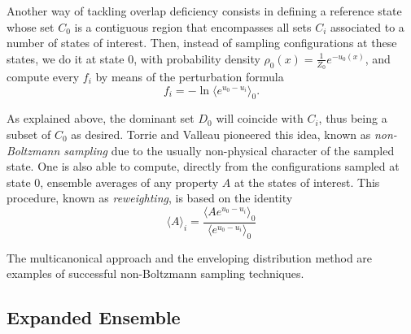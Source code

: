 \documentclass[aip,jcp,reprint,amsmath,amssymb]{revtex4-1}
\begin{document}
Another way of tackling overlap deficiency consists in defining a reference state whose set $C_0$ is a contiguous region that encompasses all sets $C_i$ associated to a number of states of interest. Then, instead of sampling configurations at these states, we do it at state $0$, with probability density $\rho_0(x) = \frac{1}{Z_0} e^{-u_0(x)}$, and compute every $f_i$ by means of the perturbation formula
\begin{equation}
\label{eq:nbs sampling free energy}
f_i = -\ln \langle e^{u_0-u_i} \rangle_0.
\end{equation}

As explained above, the dominant set $D_0$ will coincide with $C_i$, thus being a subset of $C_0$ as desired. Torrie and Valleau\cite{Torrie_1977} pioneered this idea, known as \textit{non-Boltzmann sampling} due to the usually non-physical character of the sampled state. One is also able to compute, directly from the configurations sampled at state $0$, ensemble averages of any property $A$ at the states of interest. This procedure, known as \textit{reweighting}, is based on the identity\cite{Torrie_1977}
\begin{equation}
\label{eq:nbs sampling reweighting}
\langle A \rangle_i = \frac{\langle A e^{u_0 - u_i} \rangle_0}{\langle e^{u_0 - u_i} \rangle_0} %
\end{equation}

The multicanonical approach\cite{Berg_1992, Lee_1993, Abreu_2006} and the enveloping distribution method\cite{Christ_2007, *Christ_2008, *Christ_2009} are examples of successful non-Boltzmann sampling techniques.

\subsection{Expanded Ensemble}
\label{sec:expanded ensemble}
	
\end{document}
